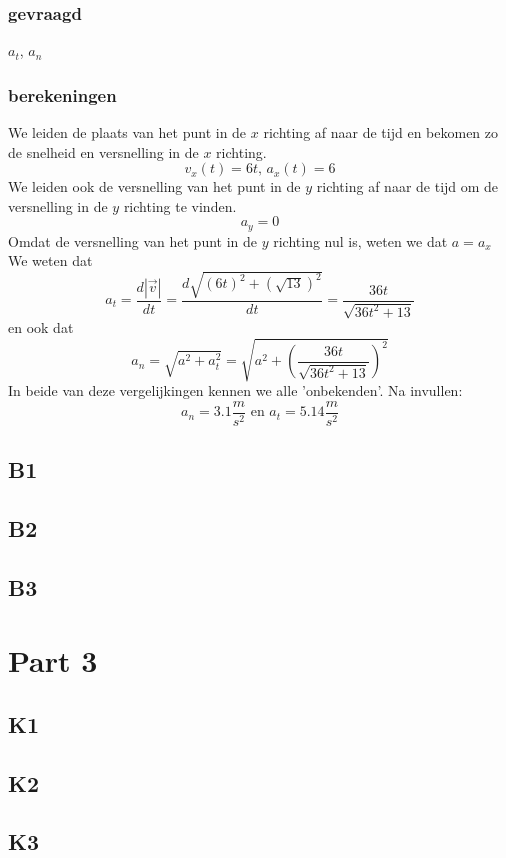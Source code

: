 \documentclass[10pt,a4paper]{article}
\begin{document}
\subsubsection*{gevraagd}
$a_{t}$, $a_{n}$
\subsubsection*{berekeningen}
We leiden de plaats van het punt in de $x$ richting af naar de tijd en bekomen zo de snelheid en versnelling in de $x$ richting.
\[v_{x}(t)=6t\text{, }a_{x}(t) = 6\]
We leiden ook de versnelling van het punt in de $y$ richting af naar de tijd om de versnelling in de $y$ richting te vinden.
\[
a_{y} = 0
\]
Omdat de versnelling van het punt in de $y$ richting nul is, weten we dat $a = a_{x}$
\\We weten dat
\[
a_{t} = \frac{d|\vec{v}|}{dt} = \frac{d\sqrt{(6t)^{2} + (\sqrt{13})^{2}}}{dt} = \frac{36t}{\sqrt{36t^{2}+13}}
\]
en ook dat
\[
a_{n} = \sqrt{a^{2} + a_{t}^{2}} = \sqrt{a^{2} + \left(\frac{36t}{\sqrt{36t^{2}+13}}\right)^{2}}
\]
In beide van deze vergelijkingen kennen we alle 'onbekenden'. Na invullen:
\[
a_{n} = 3.1\frac{m}{s^{2}} \text{ en } a_{t} = 5.14\frac{m}{s^{2}}
\]

\subsection{B1}

\subsection{B2}

\subsection{B3}

\section{Part 3}
\subsection{K1}

\subsection{K2}

\subsection{K3}
\end{document}
